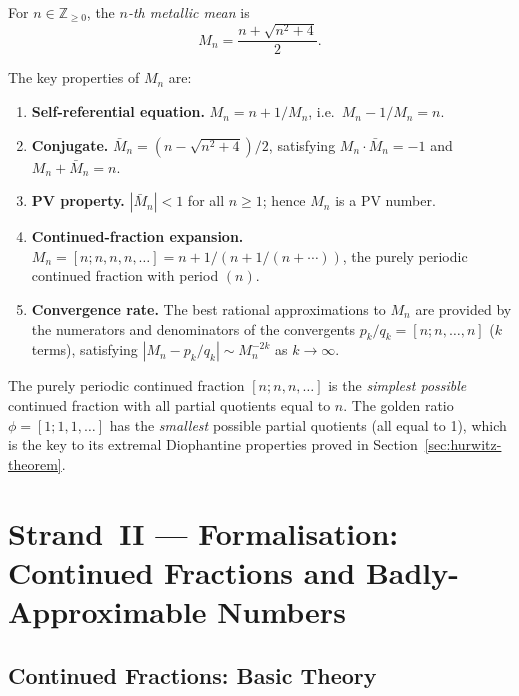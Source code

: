\begin{definition}\label{def:metallic-mean}
For $n \in \mathbb{Z}_{\geq 0}$, the \emph{$n$-th
metallic mean} is
\[
  M_n = \frac{n + \sqrt{n^2+4}}{2}.
\]
\end{definition}

The key properties of $M_n$ are:

\begin{enumerate}
  \item \textbf{Self-referential equation.}
        $M_n = n + 1/M_n$, i.e.\ $M_n - 1/M_n = n$.
  \item \textbf{Conjugate.}
        $\bar{M}_n = (n - \sqrt{n^2+4})/2$,
        satisfying $M_n \cdot \bar{M}_n = -1$
        and $M_n + \bar{M}_n = n$.
  \item \textbf{PV property.}
        $|\bar{M}_n| < 1$ for all $n \geq 1$;
        hence $M_n$ is a PV number.
  \item \textbf{Continued-fraction expansion.}
        $M_n = [n; n, n, n, \ldots] = n + 1/(n + 1/(n + \cdots))$,
        the purely periodic continued fraction with
        period $(n)$.
  \item \textbf{Convergence rate.}
        The best rational approximations to $M_n$
        are provided by the numerators and
        denominators of the convergents
        $p_k/q_k = [n; n, \ldots, n]$ ($k$ terms),
        satisfying
        $|M_n - p_k/q_k| \sim M_n^{-2k}$ as $k \to \infty$.
\end{enumerate}

The purely periodic continued fraction
$[n; n, n, \ldots]$ is the \emph{simplest possible}
continued fraction with all partial quotients
equal to $n$.  The golden ratio $\phi = [1;1,1,\ldots]$
has the \emph{smallest} possible partial quotients
(all equal to 1), which is the key to its extremal
Diophantine properties proved in
Section~\ref{sec:hurwitz-theorem}.

\section{Strand~II — Formalisation: Continued Fractions and
         Badly-Approximable Numbers}
\label{sec:continued-fractions}

\subsection{Continued Fractions: Basic Theory}
\label{subsec:cf-basics}

